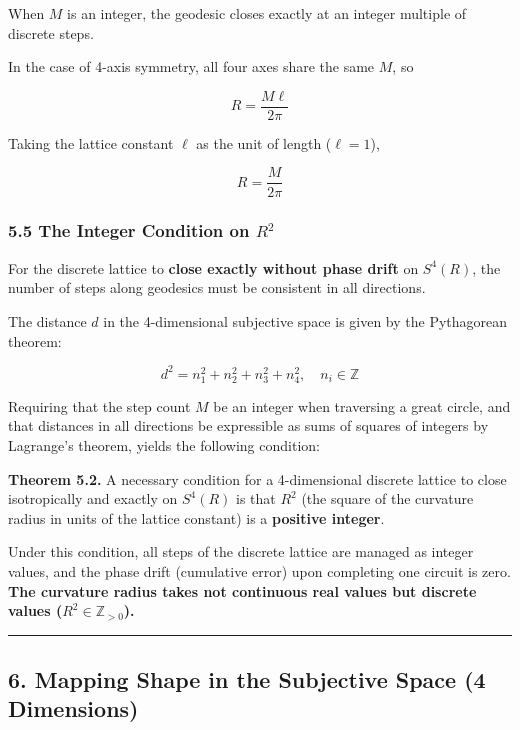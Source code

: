 \documentclass[a4paper,11pt]{article}
\begin{document}
When \(M\) is an integer, the geodesic closes exactly at an integer
multiple of discrete steps.

In the case of 4-axis symmetry, all four axes share the same \(M\), so

\[R = \frac{M \ell}{2\pi}\]

Taking the lattice constant \(\ell\) as the unit of length
(\(\ell = 1\)),

\[R = \frac{M}{2\pi}\]

\subsubsection{\texorpdfstring{5.5 The Integer Condition on
\(R^2\)}{5.5 The Integer Condition on R\^{}2}}\label{the-integer-condition-on-r2}

For the discrete lattice to \textbf{close exactly without phase drift}
on \(S^4(R)\), the number of steps along geodesics must be consistent in
all directions.

The distance \(d\) in the 4-dimensional subjective space is given by the
Pythagorean theorem:

\[d^2 = n_1^2 + n_2^2 + n_3^2 + n_4^2, \quad n_i \in \mathbb{Z}\]

Requiring that the step count \(M\) be an integer when traversing a
great circle, and that distances in all directions be expressible as
sums of squares of integers by Lagrange's theorem, yields the following
condition:

\textbf{Theorem 5.2.} A necessary condition for a 4-dimensional discrete
lattice to close isotropically and exactly on \(S^4(R)\) is that \(R^2\)
(the square of the curvature radius in units of the lattice constant) is
a \textbf{positive integer}.

Under this condition, all steps of the discrete lattice are managed as
integer values, and the phase drift (cumulative error) upon completing
one circuit is zero. \textbf{The curvature radius takes not continuous
real values but discrete values (\(R^2 \in \mathbb{Z}_{>0}\)).}

\begin{center}\rule{0.5\linewidth}{0.5pt}\end{center}

\subsection{6. Mapping Shape in the Subjective Space (4
Dimensions)}\label{mapping-shape-in-the-subjective-space-4-dimensions}
\end{document}
